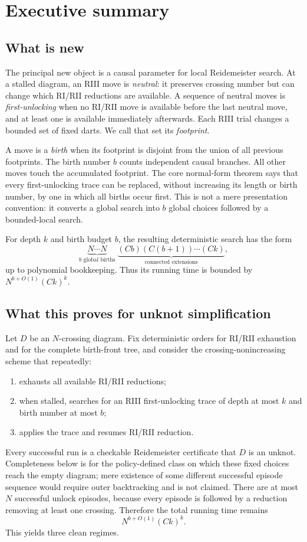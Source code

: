 \section{Executive summary}
\label{sec:summary}

\subsection{What is new}

The principal new object is a causal parameter for local Reidemeister search.
At a stalled diagram, an RIII move is \emph{neutral}: it preserves crossing
number but can change which RI/RII reductions are available.  A sequence of
neutral moves is \emph{first-unlocking} when no RI/RII move is available before
the last neutral move, and at least one is available immediately afterwards.
Each RIII trial changes a bounded set of fixed darts.  We call that set its
\emph{footprint}.

A move is a \emph{birth} when its footprint is disjoint from the union of all
previous footprints.  The birth number $b$ counts independent causal branches.
All other moves touch the accumulated footprint.  The core normal-form theorem
says that every first-unlocking trace can be replaced, without increasing its
length or birth number, by one in which all births occur first.  This is not a
mere presentation convention: it converts a global search into $b$ global
choices followed by a bounded-local search.

For depth $k$ and birth budget $b$, the resulting deterministic search has the
form
\[
 \underbrace{N\cdots N}_{b\text{ global births}}
 \;\underbrace{(C b)(C(b+1))\cdots(Ck)}_{\text{connected extensions}},
\]
up to polynomial bookkeeping.  Thus its running time is bounded by
$N^{b+O(1)}(Ck)^k$.

\subsection{What this proves for unknot simplification}

Let $D$ be an $N$-crossing diagram.  Fix deterministic orders for RI/RII
exhaustion and for the complete birth-front tree, and consider the
crossing-nonincreasing scheme that repeatedly:
\begin{enumerate}
\item exhausts all available RI/RII reductions;
\item when stalled, searches for an RIII first-unlocking trace of depth at most
      $k$ and birth number at most $b$;
\item applies the trace and resumes RI/RII reduction.
\end{enumerate}
Every successful run is a checkable Reidemeister certificate that $D$ is an
unknot.  Completeness below is for the policy-defined class on which these fixed
choices reach the empty diagram; mere existence of some different successful
episode sequence would require outer backtracking and is not claimed.  There are at most $N$ successful unlock episodes, because every episode
is followed by a reduction removing at least one crossing.  Therefore the total
running time remains
\[
  N^{b+O(1)}(Ck)^k.
\]
This yields three clean regimes.

